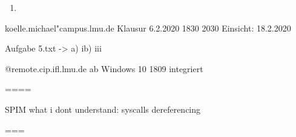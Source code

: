 \begin{enumerate}[label={T\arabic*},start=2]
	\item 
\end{enumerate}

koelle.michael"campus.lmu.de
Klausur 6.2.2020 1830 2030
Einsicht: 18.2.2020

Aufgabe 5.txt -> 
a) 
ib) iii

@remote.cip.ifl.lmu.de
ab Windows 10 1809 integriert


====

SPIM
what i dont understand: syscalls
dereferencing

===
